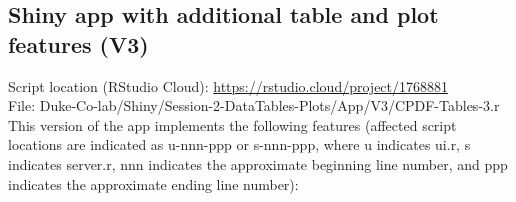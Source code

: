 \documentclass[10pt, letterpaper]{article}
\begin{document}
\begin{spacing}{1.0}

\subsection{Shiny app with additional table and plot features (V3)}\label{sec:DTplot-Shiny-2}

Script location (RStudio Cloud): \url{https://rstudio.cloud/project/1768881}\\
File: Duke-Co-lab/Shiny/Session-2-DataTables-Plots/App/V3/CPDF-Tables-3.r\\

This version of the app implements the following features (affected script locations are indicated as u-nnn-ppp or s-nnn-ppp, where u indicates ui.r, s indicates server.r, nnn indicates the approximate beginning line number, and ppp indicates the approximate ending line number):


\end{spacing}
\end{document}
